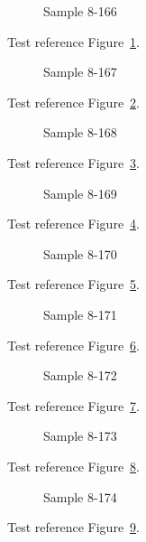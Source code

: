 \begin{figure}[tbhp]
\caption{Sample 8-166}
\label{fig:sample-8-166}
\end{figure}

Test reference Figure~\ref{fig:sample-8-166}.

\begin{figure}[tbhp]
\caption{Sample 8-167}
\label{fig:sample-8-167}
\end{figure}

Test reference Figure~\ref{fig:sample-8-167}.

\begin{figure}[tbhp]
\caption{Sample 8-168}
\label{fig:sample-8-168}
\end{figure}

Test reference Figure~\ref{fig:sample-8-168}.

\begin{figure}[tbhp]
\caption{Sample 8-169}
\label{fig:sample-8-169}
\end{figure}

Test reference Figure~\ref{fig:sample-8-169}.

\begin{figure}[tbhp]
\caption{Sample 8-170}
\label{fig:sample-8-170}
\end{figure}

Test reference Figure~\ref{fig:sample-8-170}.

\begin{figure}[tbhp]
\caption{Sample 8-171}
\label{fig:sample-8-171}
\end{figure}

Test reference Figure~\ref{fig:sample-8-171}.

\begin{figure}[tbhp]
\caption{Sample 8-172}
\label{fig:sample-8-172}
\end{figure}

Test reference Figure~\ref{fig:sample-8-172}.

\begin{figure}[tbhp]
\caption{Sample 8-173}
\label{fig:sample-8-173}
\end{figure}

Test reference Figure~\ref{fig:sample-8-173}.

\begin{figure}[tbhp]
\caption{Sample 8-174}
\label{fig:sample-8-174}
\end{figure}

Test reference Figure~\ref{fig:sample-8-174}.

